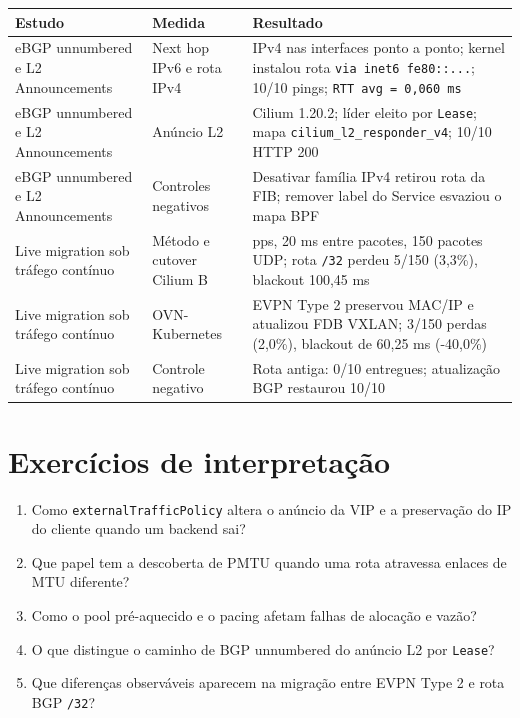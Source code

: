 \documentclass[12pt,openany,oneside,a4paper,chapter=TITLE,english,brazil]{abntex2}
\providecommand{\tightlist}{\setlength{\itemsep}{0pt}\setlength{\parskip}{0pt}}
\begin{document}
\begin{quadro}[!htbp]
\caption{Resultados de unnumbered, L2 e migração}
\footnotesize
\begin{tabularx}{\textwidth}{|>{\raggedright\arraybackslash\hsize=0.845\hsize}X|>{\raggedright\arraybackslash\hsize=0.714\hsize}X|>{\raggedright\arraybackslash\hsize=1.442\hsize}X|}
\hline
\textbf{Estudo} & \textbf{Medida} & \textbf{Resultado} \\
\hline
eBGP unnumbered e L2 Announcements & Next hop IPv6 e rota IPv4 & 0 IPv4 nas interfaces ponto a ponto; kernel instalou rota
\texttt{via inet6 fe80:\allowbreak{}:\allowbreak{}.\allowbreak{}.\allowbreak{}.\allowbreak{}};
10/10 pings; \texttt{RTT avg =\allowbreak{} 0,\allowbreak{}060 ms} \\
\hline
eBGP unnumbered e L2 Announcements & Anúncio L2 & Cilium 1.20.2; líder eleito por \texttt{Lease}; mapa
\texttt{cilium\_\allowbreak{}l2\_\allowbreak{}responder\_\allowbreak{}v4};
10/10 HTTP 200 \\
\hline
eBGP unnumbered e L2 Announcements & Controles negativos & Desativar família IPv4 retirou rota da FIB; remover label do Service
esvaziou o mapa BPF \\
\hline
Live migration sob tráfego contínuo & Método e cutover Cilium B & 50 pps, 20 ms entre pacotes, 150 pacotes UDP; rota
\texttt{/\allowbreak{}32} perdeu 5/150 (3,3\%), blackout 100,45 ms \\
\hline
Live migration sob tráfego contínuo & OVN-Kubernetes & EVPN Type 2 preservou MAC/IP e atualizou FDB VXLAN; 3/150 perdas
(2,0\%), blackout de 60,25 ms (-40,0\%) \\
\hline
Live migration sob tráfego contínuo & Controle negativo & Rota antiga: 0/10 entregues; atualização BGP restaurou 10/10 \\
\hline
\end{tabularx}
\end{quadro}

\section{Exercícios de interpretação}\label{exercuxedcios-de-interpretauxe7uxe3o-2}

\begin{enumerate}
\def\labelenumi{\arabic{enumi}.}
\tightlist
\item
  Como \texttt{external\allowbreak{}Traffic\allowbreak{}Policy} altera o anúncio da VIP e a preservação do IP do cliente quando um backend sai?
\item
  Que papel tem a descoberta de PMTU quando uma rota atravessa enlaces de MTU diferente?
\item
  Como o pool pré-aquecido e o pacing afetam falhas de alocação e vazão?
\item
  O que distingue o caminho de BGP unnumbered do anúncio L2 por \texttt{Lease}?
\item
  Que diferenças observáveis aparecem na migração entre EVPN Type 2 e rota BGP \texttt{/\allowbreak{}32}?
\end{enumerate}
\end{document}
